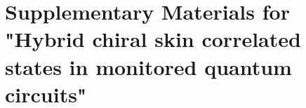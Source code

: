 \documentclass[longbibliography, aps, prx, amsmath, amssymb, amsfonts, twocolumn,superscriptaddress, footinbib]{revtex4-1}
\begin{document}
	

	\newpage
	\appendix

	\setcounter{section}{0}

    \section*{Supplementary Materials for "Hybrid chiral skin correlated states in monitored quantum circuits"}
    \setcounter{equation}{0}  %
    \setcounter{figure}{0}  %
    \renewcommand{\theequation}{S\arabic{equation}}  %
    \renewcommand{\thefigure}{S\arabic{figure}}  %
    \renewcommand{\thesubsection}{S\arabic{subsection}}  %


\end{document}
